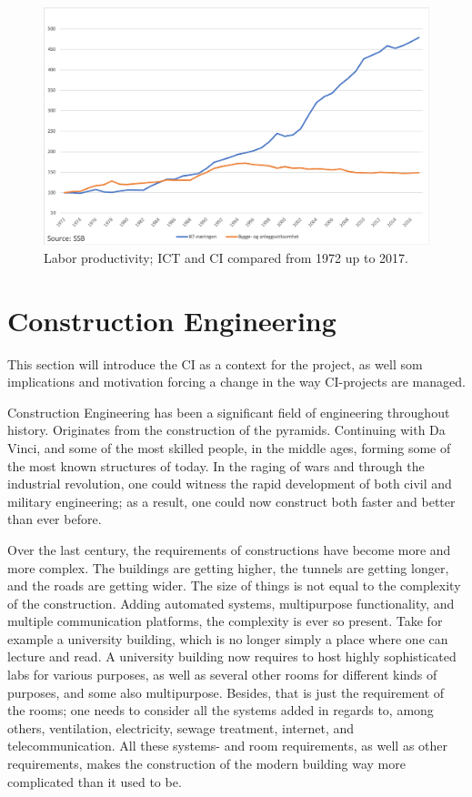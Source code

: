 \begin{figure}
    \centering
    \includegraphics[width=\textwidth]{fig/ICT_BA_1972.png}
    \caption{Labor productivity; ICT and CI compared from 1972 up to 2017.}
    \label{fig:ICT_BA_1972}
\end{figure}

\section{Construction Engineering}
This section will introduce the CI as a context for the project, as well som implications and motivation forcing a change in the way CI-projects are managed. 

Construction Engineering has been a significant field of engineering throughout history. Originates from the construction of the pyramids. Continuing with Da Vinci, and some of the most skilled people, in the middle ages, forming some of the most known structures of today. In the raging of wars and through the industrial revolution, one could witness the rapid development of both civil and military engineering; as a result, one could now construct both faster and better than ever before.

Over the last century, the requirements of constructions have become more and more complex. The buildings are getting higher, the tunnels are getting longer, and the roads are getting wider. The size of things is not equal to the complexity of the construction. Adding automated systems, multipurpose functionality, and multiple communication platforms, the complexity is ever so present. Take for example a university building, which is no longer simply a place where one can lecture and read. A university building now requires to host highly sophisticated labs for various purposes, as well as several other rooms for different kinds of purposes, and some also multipurpose. Besides, that is just the requirement of the rooms; one needs to consider all the systems added in regards to, among others, ventilation, electricity, sewage treatment, internet, and telecommunication. All these systems- and room requirements, as well as other requirements, makes the construction of the modern building way more complicated than it used to be. 

